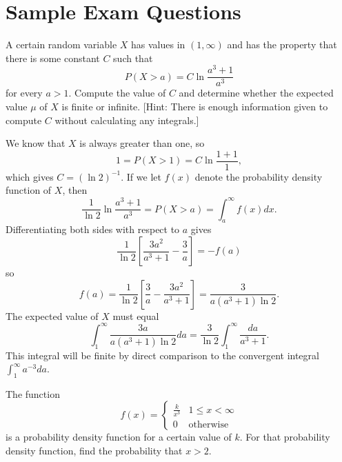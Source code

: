 \documentclass{ximera}
\begin{document}
\section*{Sample Exam Questions}

\begin{question}%
A certain random variable $X$ has values in $(1,\infty)$ and has the property that there is some constant $C$ such that
\[ P( X > a) = C \ln \frac{a^3+1}{a^3} \]
for every $a > 1$. Compute the value of $C$ and determine whether the expected value $\mu$ of $X$ is finite or infinite. [Hint: There is enough information given to compute $C$ without calculating any integrals.]
\begin{multipleChoice}
\end{multipleChoice}


\begin{feedback}
We know that $X$ is always greater than one, so
\[ 1 = P(X > 1) = C \ln \frac{1+1}{1}, \]
which gives $C = (\ln 2)^{-1}$.  If we let $f(x)$ denote the probability density function of $X$, then
\[ \frac{1}{\ln 2} \ln \frac{a^3+1}{a^3} = P(X > a) = \int_a^\infty f(x) dx. \]
Differentiating both sides with respect to $a$ gives
\[ \frac{1}{\ln 2} \left[ \frac{3 a^2}{a^3+1} - \frac{3}{a} \right] = - f(a) \]
so 
\[ f(a) = \frac{1}{\ln 2} \left[ \frac{3}{a} - \frac{3a^2}{a^3+1} \right] = \frac{3}{a(a^3+1) \ln 2}. \]
The expected value of $X$ must equal
\[ \int_1^\infty \frac{3a}{a(a^3+1) \ln 2} da = \frac{3}{\ln 2} \int_1^\infty \frac{da}{a^3+1}. \]
This integral will be finite by direct comparison to the convergent integral $\int_1^\infty a^{-3} da$.
\end{feedback}
\end{question}

\begin{question}%

The function 
\[ f(x) = \begin{cases} \displaystyle \frac{k}{x^3} & 1 \leq x < \infty \\ 0 & \text{otherwise} \end{cases} \]
is a probability density function for a certain value of \(k\). For that probability density function, find the probability that \(x > 2\).
\begin{multiplechoice}
\end{multiplechoice}

\end{question}
\end{document}

